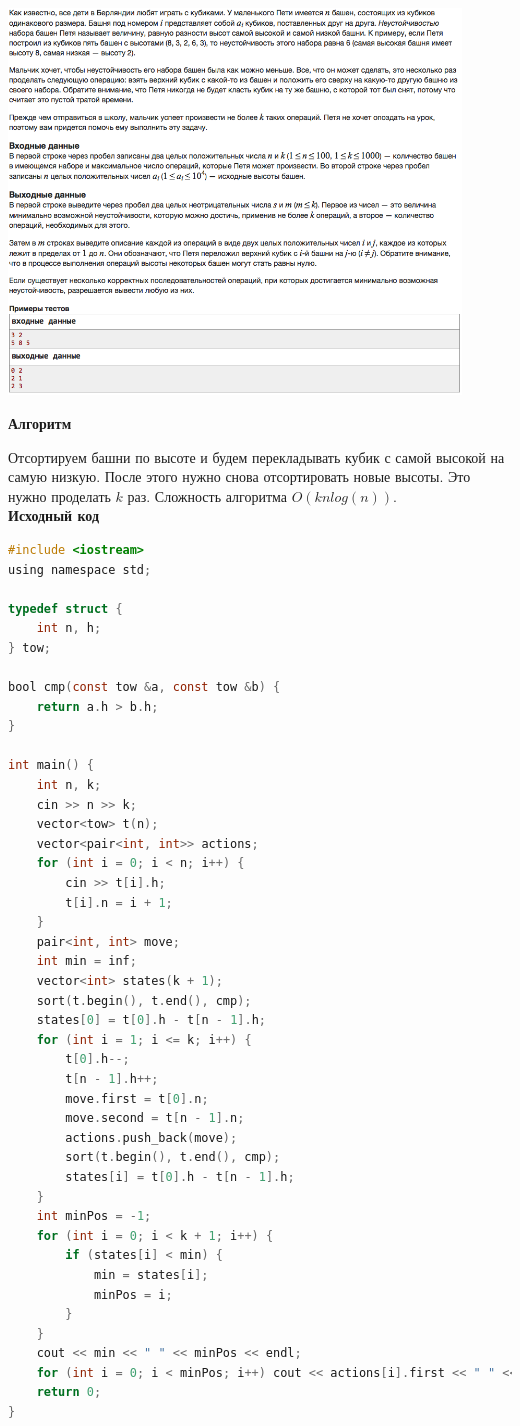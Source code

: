 \documentclass[a4paper,12pt]{article}
\begin{document}
\begin{center}
\includegraphics[width=0.9\textwidth]{C_274/C_274_B.png}\\ [1cm]
\end{center}

\textbf{{\large Алгоритм}}

Отсортируем башни по высоте и будем перекладывать кубик с самой высокой на самую низкую. После этого нужно снова отсортировать новые высоты. Это нужно проделать $k$ раз. Сложность алгоритма $O(knlog(n))$.\\

\textbf{{\large Исходный код}} \\
\begin{lstlisting}[language=C]
#include <iostream>
using namespace std;

typedef struct {
    int n, h;
} tow;

bool cmp(const tow &a, const tow &b) {
    return a.h > b.h;
}

int main() {
    int n, k;
    cin >> n >> k;
    vector<tow> t(n);
    vector<pair<int, int>> actions;
    for (int i = 0; i < n; i++) {
        cin >> t[i].h;
        t[i].n = i + 1;
    }
    pair<int, int> move;
    int min = inf;
    vector<int> states(k + 1);
    sort(t.begin(), t.end(), cmp);
    states[0] = t[0].h - t[n - 1].h;
    for (int i = 1; i <= k; i++) {
        t[0].h--;
        t[n - 1].h++;
        move.first = t[0].n;
        move.second = t[n - 1].n;
        actions.push_back(move);
        sort(t.begin(), t.end(), cmp);
        states[i] = t[0].h - t[n - 1].h;
    }
    int minPos = -1;
    for (int i = 0; i < k + 1; i++) {
        if (states[i] < min) {
            min = states[i];
            minPos = i;
        }
    }
    cout << min << " " << minPos << endl;
    for (int i = 0; i < minPos; i++) cout << actions[i].first << " " << actions[i].second << endl;
    return 0;
}
\end{lstlisting}
\end{document}
